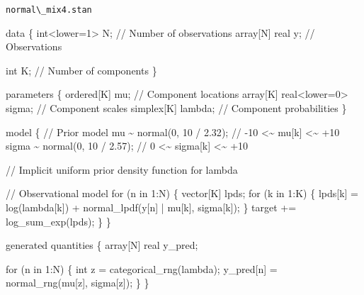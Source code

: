 \documentclass[
  letterpaper,
  DIV=11,
  numbers=noendperiod]{scrartcl}
\newenvironment{Shaded}{\begin{snugshade}}{\end{snugshade}}
\newcommand{\CommentTok}[1]{\textcolor[rgb]{0.37,0.37,0.37}{#1}}
\newcommand{\ControlFlowTok}[1]{\textcolor[rgb]{0.00,0.23,0.31}{#1}}
\newcommand{\DataTypeTok}[1]{\textcolor[rgb]{0.68,0.00,0.00}{#1}}
\newcommand{\DecValTok}[1]{\textcolor[rgb]{0.68,0.00,0.00}{#1}}
\newcommand{\FloatTok}[1]{\textcolor[rgb]{0.68,0.00,0.00}{#1}}
\newcommand{\KeywordTok}[1]{\textcolor[rgb]{0.00,0.23,0.31}{#1}}
\newcommand{\NormalTok}[1]{\textcolor[rgb]{0.00,0.23,0.31}{#1}}
\begin{document}
\begin{codelisting}

\caption{\texttt{normal\textbackslash\_mix4.stan}}

\begin{Shaded}
\begin{Highlighting}[]
\KeywordTok{data}\NormalTok{ \{}
  \DataTypeTok{int}\NormalTok{\textless{}}\KeywordTok{lower}\NormalTok{=}\DecValTok{1}\NormalTok{\textgreater{} N;  }\CommentTok{// Number of observations}
  \DataTypeTok{array}\NormalTok{[N] }\DataTypeTok{real}\NormalTok{ y; }\CommentTok{// Observations}

  \DataTypeTok{int}\NormalTok{ K; }\CommentTok{// Number of components}
\NormalTok{\}}

\KeywordTok{parameters}\NormalTok{ \{}
  \DataTypeTok{ordered}\NormalTok{[K] mu;                }\CommentTok{// Component locations}
  \DataTypeTok{array}\NormalTok{[K] }\DataTypeTok{real}\NormalTok{\textless{}}\KeywordTok{lower}\NormalTok{=}\DecValTok{0}\NormalTok{\textgreater{} sigma; }\CommentTok{// Component scales}
  \DataTypeTok{simplex}\NormalTok{[K] lambda;            }\CommentTok{// Component probabilities}
\NormalTok{\}}

\KeywordTok{model}\NormalTok{ \{}
  \CommentTok{// Prior model}
\NormalTok{  mu \textasciitilde{} normal(}\DecValTok{0}\NormalTok{, }\DecValTok{10}\NormalTok{ / }\FloatTok{2.32}\NormalTok{);    }\CommentTok{// {-}10 \textless{}\textasciitilde{}  mu[k]   \textless{}\textasciitilde{} +10}
\NormalTok{  sigma \textasciitilde{} normal(}\DecValTok{0}\NormalTok{, }\DecValTok{10}\NormalTok{ / }\FloatTok{2.57}\NormalTok{); }\CommentTok{//   0 \textless{}\textasciitilde{} sigma[k] \textless{}\textasciitilde{} +10}

  \CommentTok{// Implicit uniform prior density function for lambda}

  \CommentTok{// Observational model}
  \ControlFlowTok{for}\NormalTok{ (n }\ControlFlowTok{in} \DecValTok{1}\NormalTok{:N) \{}
    \DataTypeTok{vector}\NormalTok{[K] lpds;}
    \ControlFlowTok{for}\NormalTok{ (k }\ControlFlowTok{in} \DecValTok{1}\NormalTok{:K) \{}
\NormalTok{      lpds[k] = log(lambda[k]) + normal\_lpdf(y[n] | mu[k], sigma[k]);}
\NormalTok{    \}}
    \KeywordTok{target +=}\NormalTok{ log\_sum\_exp(lpds);}
\NormalTok{  \}}
\NormalTok{\}}

\KeywordTok{generated quantities}\NormalTok{ \{}
  \DataTypeTok{array}\NormalTok{[N] }\DataTypeTok{real}\NormalTok{ y\_pred;}

  \ControlFlowTok{for}\NormalTok{ (n }\ControlFlowTok{in} \DecValTok{1}\NormalTok{:N) \{}
    \DataTypeTok{int}\NormalTok{ z = categorical\_rng(lambda);}
\NormalTok{    y\_pred[n] = normal\_rng(mu[z], sigma[z]);}
\NormalTok{  \}}
\NormalTok{\}}
\end{Highlighting}
\end{Shaded}

\end{codelisting}
\end{document}
